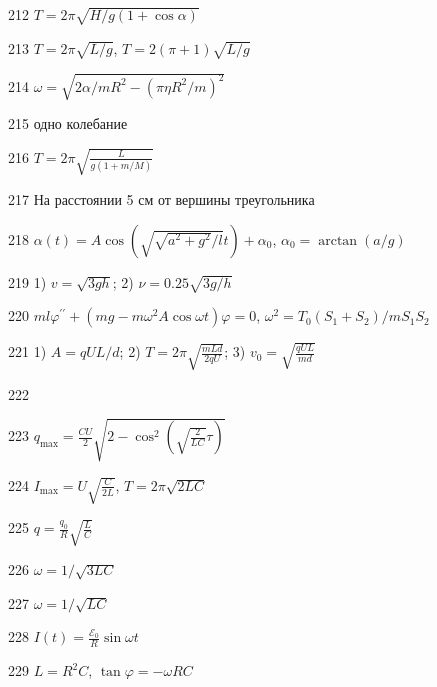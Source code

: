 \begin{Answer}{212}
$T=2\pi \sqrt{H/g(1+\cos \alpha)}$
\end{Answer}
\begin{Answer}{213}
$T=2\pi\sqrt{L/g}$, $T=2(\pi+1)\sqrt{L/g}$
\end{Answer}
\begin{Answer}{214}
$\omega = \sqrt{2\alpha/mR^2-(\pi \eta R^2/m)^2}$
\end{Answer}
\begin{Answer}{215}
одно колебание
\end{Answer}
\begin{Answer}{216}
$T=2\pi \sqrt{\frac{L}{g(1+m/M)}}$
\end{Answer}
\begin{Answer}{217}
На расстоянии 5 см от вершины треугольника
\end{Answer}
\begin{Answer}{218}
$\alpha(t) = A \cos(\sqrt{\sqrt{a^2+g^2}/l}t) + \alpha_0$, $\alpha_0 = \arctan(a/g)$
\end{Answer}
\begin{Answer}{219}
1) $v=\sqrt{3gh}$; 2) $\nu = 0.25\sqrt{3g/h }$
\end{Answer}
\begin{Answer}{220}
$ml \varphi^{\prime \prime} + (mg-m \omega^2 A \cos \omega t) \varphi = 0$, $\omega^2 = T_0(S_1+S_2)/m S_1 S_2$
\end{Answer}
\begin{Answer}{221}
1) $A=qUL/d$; 2) $T=2\pi\sqrt{\frac{mLd}{2qU}}$; 3) $v_0 = \sqrt{\frac{qUL}{md }}$
\end{Answer}
\begin{Answer}{222}
\end{Answer}
\begin{Answer}{223}
$q_{\max} = \frac{CU}{2}\sqrt{2-\cos^2 \left( \sqrt{\frac{2}{LC}} \tau \right)}$
\end{Answer}
\begin{Answer}{224}
$I_{\max} = U \sqrt{\frac{C}{2L}}$, $T=2 \pi \sqrt{2LC}$
\end{Answer}
\begin{Answer}{225}
$q=\frac{q_0}{R}\sqrt{\frac{L}{C}}$
\end{Answer}
\begin{Answer}{226}
$\omega = 1/\sqrt{3LC}$
\end{Answer}
\begin{Answer}{227}
$\omega = 1/\sqrt{LC}$
\end{Answer}
\begin{Answer}{228}
$I(t) = \frac{\mathcal{E}_0}{R} \sin \omega t$
\end{Answer}
\begin{Answer}{229}
$L=R^2C$, $\tan \varphi = -\omega RC$
\end{Answer}
